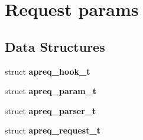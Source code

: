 \section{Request params}
\label{group__params}
\subsection*{Data Structures}
\begin{CompactItemize}
\item 
struct {\bf apreq\_\-hook\_\-t}
\item 
struct {\bf apreq\_\-param\_\-t}
\item 
struct {\bf apreq\_\-parser\_\-t}
\item 
struct {\bf apreq\_\-request\_\-t}
\end{CompactItemize}

